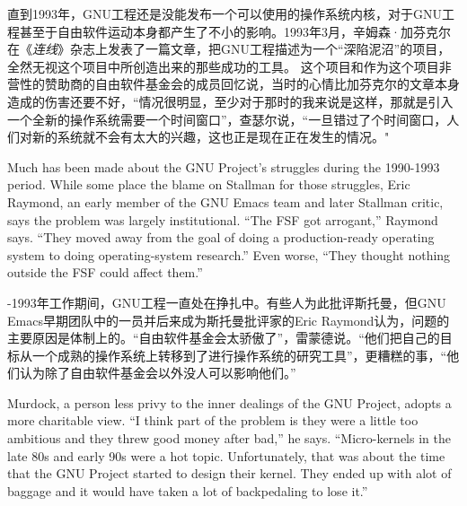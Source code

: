 \ifdefined\chs
直到1993年，GNU工程还是没能发布一个可以使用的操作系统内核，对于GNU工程甚至于自由软件运动本身都产生了不小的影响。1993年3月，辛姆森·加芬克尔在《\textit{连线}》杂志上发表了一篇文章，把GNU工程描述为一个``深陷泥沼''的项目，全然无视这个项目中所创造出来的那些成功的工具。 这个项目和作为这个项目非营性的赞助商的自由软件基金会的成员回忆说，当时的心情比加芬克尔的文章本身造成的伤害还要不好，``情况很明显，至少对于那时的我来说是这样，那就是引入一个全新的操作系统需要一个时间窗口''，查瑟尔说，``一旦错过了个时间窗口，人们对新的系统就不会有太大的兴趣，这也正是现在正在发生的情况。"
\fi

\ifdefined\eng
Much has been made about the GNU Project's struggles during the 1990-1993 period. While some place the blame on Stallman for those struggles, Eric Raymond, an early member of the GNU Emacs team and later Stallman critic, says the problem was largely institutional. ``The FSF got arrogant,'' Raymond says. ``They moved away from the goal of doing a production-ready operating system to doing operating-system research.'' Even worse, ``They thought nothing outside the FSF could affect them.''
\fi

\ifdefined{}-1993年工作期间，GNU工程一直处在挣扎中。有些人为此批评斯托曼，但GNU Emacs早期团队中的一员并后来成为斯托曼批评家的Eric Raymond认为，问题的主要原因是体制上的。``自由软件基金会太骄傲了''，雷蒙德说。``他们把自己的目标从一个成熟的操作系统上转移到了进行操作系统的研究工具''，更糟糕的事，``他们认为除了自由软件基金会以外没人可以影响他们。''
\fi

\ifdefined\eng
Murdock, a person less privy to the inner dealings of the GNU Project, adopts a more charitable view. ``I think part of the problem is they were a little too ambitious and they threw good money after bad,'' he says. ``Micro-kernels in the late 80s and early 90s were a hot topic. Unfortunately, that was about the time that the GNU Project started to design their kernel. They ended up with alot of baggage and it would have taken a lot of backpedaling to lose it.''
\fi

